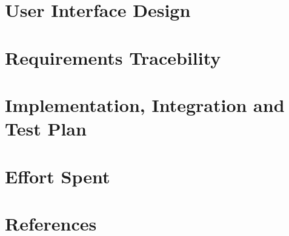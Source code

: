 \documentclass[fontsize=11pt,paper=a4,pagesize=auto]{report}
\begin{document}
\chapter{User Interface Design}


\chapter{Requirements Tracebility}




\chapter{Implementation, Integration and Test Plan}



\chapter{Effort Spent}

\chapter{References}
\end{document}
